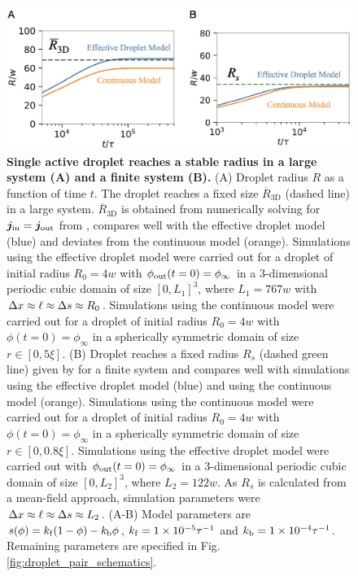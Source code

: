 \begin{figure}[tb]
\centering
\includegraphics[scale=0.5]{MainContent/Figures/active_droplet_3D.pdf}
\caption{\textbf{Single active droplet reaches a stable radius in a large system (A) and a finite system (B).}
(A) Droplet radius $R$ as a function of time $t$.
The droplet reaches a fixed size $\overline{R}_\mathrm{3D}$ (dashed line) in a large system. 
$\overline{R}_\mathrm{3D}$ is obtained from numerically solving for $\boldsymbol{j}_\mathrm{in} = \boldsymbol{j}_\mathrm{out}$ from , compares well with the effective droplet model (blue) and deviates from the continuous model (orange).
Simulations using the effective droplet model were carried out for a droplet of initial radius $R_0 = 4 w$ with $\phi_\mathrm{out}(t=0) =\phi_\infty$ in a $3$-dimensional periodic cubic domain of size $[0, L_1]^3$, where $L_1 = 767w$ with $\Delta x \approx \ell \approx \Delta s \approx R_0$.
Simulations using the continuous model were carried out for a droplet of initial radius $R_0 = 4 w$ with $\phi(t=0) = \phi_\infty$ in a spherically symmetric domain of size $r \in [0, 5 \xi]$.
(B) Droplet reaches a fixed radius $R_s$ (dashed green line) given by  for a finite system and compares well with simulations using the effective droplet model (blue) and using the continuous model (orange).
Simulations using the continuous model were carried out for a droplet of initial radius $R_0 = 4 w$ with $\phi(t=0) =\phi_\infty$ in a spherically symmetric domain of size $r \in [0, 0.8 \xi]$.
Simulations using the effective droplet model were carried out with $\phi_\mathrm{out}(t=0) = \phi_\infty$ in a $3$-dimensional periodic cubic domain of size $[0, L_2]^3$, where $L_2 = 122w$.
As $R_s$ is calculated from a mean-field approach, simulation parameters were $\Delta x \approx \ell \approx \Delta s \approx L_2$.
\mbox{(A-B)}
Model parameters are $s(\phi)= k_\mathrm{f} (1 - \phi) - k_\mathrm{b} \phi$, $k_\mathrm{f} = 1 \times 10^{-5} \tau^{-1}$ and $k_\mathrm{b} = 1 \times 10^{-4}  \tau^{-1}$.
Remaining parameters are specified in Fig. \ref{fig:droplet_pair_schematics}.
}
\label{fig:active_droplet_3D}
\end{figure}

